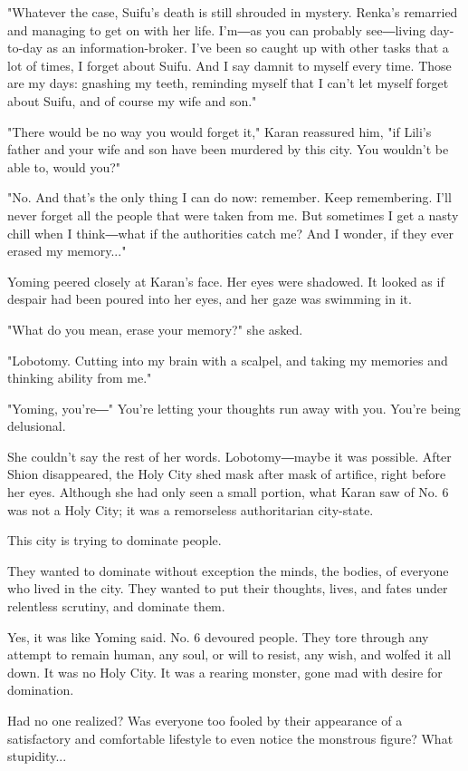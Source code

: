 "Whatever the case, Suifu's death is still shrouded in mystery. Renka's
remarried and managing to get on with her life. I'm―as you can probably
see―living day-to-day as an information-broker. I've been so caught up
with other tasks that a lot of times, I forget about Suifu. And I say
damnit to myself every time. Those are my days: gnashing my teeth,
reminding myself that I can't let myself forget about Suifu, and of
course my wife and son."

"There would be no way you would forget it," Karan reassured him, "if
Lili's father and your wife and son have been murdered by this city. You
wouldn't be able to, would you?"

"No. And that's the only thing I can do now: remember. Keep remembering.
I'll never forget all the people that were taken from me. But sometimes
I get a nasty chill when I think―what if the authorities catch me? And I
wonder, if they ever erased my memory..."

Yoming peered closely at Karan's face. Her eyes were shadowed. It looked
as if despair had been poured into her eyes, and her gaze was swimming
in it.

"What do you mean, erase your memory?" she asked.

"Lobotomy. Cutting into my brain with a scalpel, and taking my memories
and thinking ability from me."

"Yoming, you're―" You're letting your thoughts run away with you. You're
being delusional.

She couldn't say the rest of her words. Lobotomy―maybe it was possible.
After Shion disappeared, the Holy City shed mask after mask of artifice,
right before her eyes. Although she had only seen a small portion, what
Karan saw of No. 6 was not a Holy City; it was a remorseless
authoritarian city-state.

This city is trying to dominate people.

They wanted to dominate without exception the minds, the bodies, of
everyone who lived in the city. They wanted to put their thoughts,
lives, and fates under relentless scrutiny, and dominate them.

Yes, it was like Yoming said. No. 6 devoured people. They tore through
any attempt to remain human, any soul, or will to resist, any wish, and
wolfed it all down. It was no Holy City. It was a rearing monster, gone
mad with desire for domination.

Had no one realized? Was everyone too fooled by their appearance of a
satisfactory and comfortable lifestyle to even notice the monstrous
figure? What stupidity...


